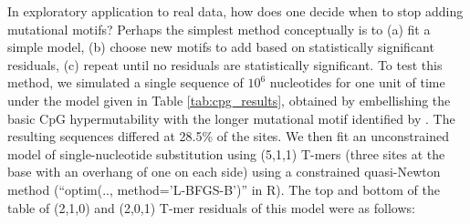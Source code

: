\documentclass{article}
\newcommand{\nA}{\mbox{A}}  %
\newcommand{\nC}{\mbox{C}}
\newcommand{\nG}{\mbox{G}}
\newcommand{\nT}{\mbox{T}}
\theoremstyle{plain}
\theoremstyle{definition}
\begin{document}
In exploratory application to real data, how does one decide when to stop adding mutational motifs?
Perhaps the simplest method conceptually is to
(a) fit a simple model,
(b) choose new motifs to add based on statistically significant residuals,
(c) repeat until no residuals are statistically significant.
To test this method,
we simulated a single sequence of $10^6$ nucleotides
for one unit of time
under the model given in Table \ref{tab:cpg_results},
obtained by embellishing the basic CpG hypermutability
with the longer mutational motif identified by \citet{harris2015evidence}.
The resulting sequences differed at 28.5\% of the sites.
We then fit an unconstrained model of single-nucleotide substitution using (5,1,1) T-mers
(three sites at the base with an overhang of one on each side)
using a constrained quasi-Newton method (``optim(.., method='L-BFGS-B')'' in R).
The top and bottom of the table of (2,1,0) and (2,0,1) T-mer residuals of this model were as follows:
\end{document}
